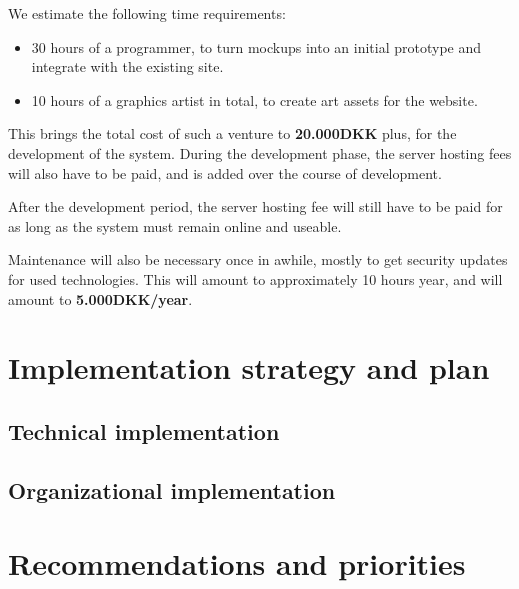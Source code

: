 We estimate the following time requirements:

\begin{itemize}
	\item 30 hours of a programmer, to turn mockups into an initial prototype and integrate with the existing site.
	\item 10 hours of a graphics artist in total, to create art assets for the website.
\end{itemize}

This brings the total cost of such a venture to \textbf{20.000DKK} plus, for the 
development of the system. During the development phase, the server hosting
fees will also have to be paid, and is added over the course of development.

After the development period, the server hosting fee will still have to be paid
for as long as the system must remain online and useable. 

Maintenance will also be necessary once in awhile, mostly to get security 
updates for used technologies. This will amount to approximately 10 hours year, 
and will amount to \textbf{5.000DKK/year}.


\section{Implementation strategy and plan}
\subsection{Technical implementation}
\subsection{Organizational implementation}

\section{Recommendations and priorities}

\newpage
